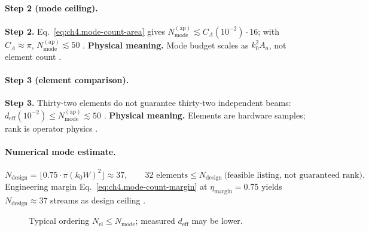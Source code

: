 \paragraph{Step 2 (mode ceiling).}
\textbf{Step 2.} Eq.~\eqref{eq:ch4.mode-count-area} gives \(N_{\mathrm{mode}}^{\mathrm{(ap)}}\lesssim C_{A}(10^{-2})\cdot16\); with \(C_{A}\approx\pi\),
\(N_{\mathrm{mode}}^{\mathrm{(ap)}}\lesssim50\) \cite{hansen1988,collin2001,harrington2001,jackson1999,stratton1941}.
\textbf{Physical meaning.} Mode budget scales as \(k_{0}^{2}A_{a}\), not element count \cite{devaney2004,harrington2001}.

\paragraph{Step 3 (element comparison).}
\textbf{Step 3.} Thirty-two elements do not guarantee thirty-two independent beams: \(d_{\mathrm{eff}}(10^{-2})\le N_{\mathrm{mode}}^{\mathrm{(ap)}}\lesssim50\)
\cite{devaney2004,stratton1941,hansen1988,harrington2001,jackson1999}.
\textbf{Physical meaning.} Elements are hardware samples; rank is operator physics \cite{hansen1988,collin2001}.

\paragraph{Numerical mode estimate.}
\begin{equation}
\label{eq:ch4.ex-mode-count-numeric}
N_{\mathrm{design}}=\lfloor0.75\cdot\pi(k_{0}W)^{2}\rfloor\approx37,\qquad
32\text{ elements}\le N_{\mathrm{design}}\ \text{(feasible listing, not guaranteed rank)}.
\end{equation}
Engineering margin Eq.~\eqref{eq:ch4.mode-count-margin} at \(\eta_{\mathrm{margin}}=0.75\) yields \(N_{\mathrm{design}}\approx37\) streams as design ceiling
\cite{harrington2001,devaney2004,collin2001,jackson1999,hansen1988,stratton1941}.

\begin{figure}[t]
\centering
{}
\caption{Typical ordering \(N_{\mathrm{el}}\le N_{\mathrm{mode}}\); measured \(d_{\mathrm{eff}}\) may be lower.}
\label{fig:ch4.ex-element-rank-order}
\end{figure}

